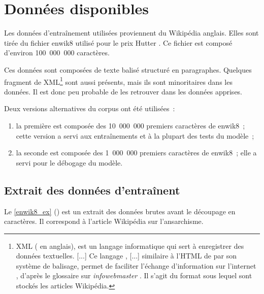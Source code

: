 \chapter{Données disponibles}
Les données d'entraînement utilisées proviennent du Wikipédia anglais.
Elles sont tirée du fichier \og enwik8\fg{} utilisé pour le prix Hutter \autocite{enwik8,Hutter2018Feb}. Ce fichier est composé d'environ 100~000~000 caractères.

Ces données sont composées de texte balisé structuré en paragraphes.
Quelques fragment de XML\footnote{XML ( en anglais), \og est un langage informatique qui sert à enregistrer des données textuelles. [...] Ce langage , [...] similaire à l'HTML de par son système de balisage, permet de faciliter l'échange d'information sur l'internet \fg{}, d'après le glossaire sur \emph{infowebmaster} \autocite{xml}. Il s'agit du format sous lequel sont stockés les articles Wikipédia.}
sont aussi présents, mais ils sont minoritaires dans les données. Il est donc peu probable de les retrouver dans les données apprises.

Deux versions alternatives du corpus ont été utilisées~:
\begin{enumerate}
	\item la première est composée des 10~000~000 premiers caractères de \og enwik8\fg{}~; cette version a servi aux entraînements et à la plupart des tests du modèle~; %
	\item la seconde est composée des 1~000~000 premiers caractères de \og enwik8\fg{}~; elle a servi pour le débogage du modèle. %
\end{enumerate}

\section{Extrait des données d'entraînent}
Le \autoref{enwik8_ex} () est un extrait des données brutes avant le découpage en caractères. Il correspond à l'article Wikipédia sur l'ansarchisme.

